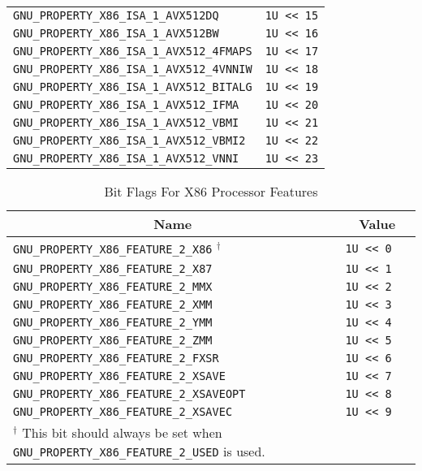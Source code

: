 \begin{table}[H]
\begin{center}
\begin{tabular}[t]{l|l}
     \texttt{GNU_PROPERTY_X86_ISA_1_AVX512DQ} & \texttt{1U << 15} \\
     \texttt{GNU_PROPERTY_X86_ISA_1_AVX512BW} & \texttt{1U << 16} \\
     \texttt{GNU_PROPERTY_X86_ISA_1_AVX512_4FMAPS} & \texttt{1U << 17} \\
     \texttt{GNU_PROPERTY_X86_ISA_1_AVX512_4VNNIW} & \texttt{1U << 18} \\
     \texttt{GNU_PROPERTY_X86_ISA_1_AVX512_BITALG} & \texttt{1U << 19} \\
     \texttt{GNU_PROPERTY_X86_ISA_1_AVX512_IFMA} & \texttt{1U << 20} \\
     \texttt{GNU_PROPERTY_X86_ISA_1_AVX512_VBMI} & \texttt{1U << 21} \\
     \texttt{GNU_PROPERTY_X86_ISA_1_AVX512_VBMI2} & \texttt{1U << 22} \\
     \texttt{GNU_PROPERTY_X86_ISA_1_AVX512_VNNI} & \texttt{1U << 23} \\
    \cline{1-2}
    \end{tabular}
  \end{center}
\end{table}

\begin{table}[H]
\Hrule
  \caption{Bit Flags For X86 Processor Features}
  \begin{center}
    \begin{tabular}[t]{l|l}
      \multicolumn{1}{c}{Name} & \multicolumn{1}{c}{Value} \\
      \hline
     \texttt{GNU_PROPERTY_X86_FEATURE_2_X86} $^\dagger$ & \texttt{1U << 0} \\
     \texttt{GNU_PROPERTY_X86_FEATURE_2_X87} & \texttt{1U << 1} \\
     \texttt{GNU_PROPERTY_X86_FEATURE_2_MMX} & \texttt{1U << 2} \\
     \texttt{GNU_PROPERTY_X86_FEATURE_2_XMM} & \texttt{1U << 3} \\
     \texttt{GNU_PROPERTY_X86_FEATURE_2_YMM} & \texttt{1U << 4} \\
     \texttt{GNU_PROPERTY_X86_FEATURE_2_ZMM} & \texttt{1U << 5} \\
     \texttt{GNU_PROPERTY_X86_FEATURE_2_FXSR} & \texttt{1U << 6} \\
     \texttt{GNU_PROPERTY_X86_FEATURE_2_XSAVE} & \texttt{1U << 7} \\
     \texttt{GNU_PROPERTY_X86_FEATURE_2_XSAVEOPT} & \texttt{1U << 8} \\
     \texttt{GNU_PROPERTY_X86_FEATURE_2_XSAVEC} & \texttt{1U << 9} \\
    \cline{1-2}
    \multicolumn{2}{p{13cm}}{\small $^\dagger$ This bit should always
    be set when \texttt{GNU_PROPERTY_X86_FEATURE_2_USED} is used.}\\
    \end{tabular}
  \end{center}
\end{table}

